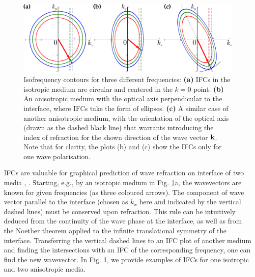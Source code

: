 \begin{figure}[ht] \caption{Isofrequency contours for three different frequencies: \textbf{(a)} IFCs in the isotropic medium are circular and centered in the $k=0$ point. \textbf{(b)} An anisotropic medium with the optical axis perpendicular to the interface, where IFCs take the form of ellipses. \textbf{(c)} A similar case of another anisotropic medium, with the orientation of the optical axis (drawn as the dashed black line) that warrants introducing the index of refraction for the shown direction of the wave vector ${\mathbf{k}}$. Note that for clarity, the plots (b) and (c) show the IFCs only for one wave polarisation. %
} \label{fg_ifc} \centering  %
	\includegraphics[width=.8\textwidth]{img/ifc_freqdispersion.pdf} 
\end{figure}
IFCs are valuable for graphical prediction of wave refraction on interface of two media \cite[p. 118]{shalaev2010book}, \cite{boardman2005negative}. Starting, e.g., by an isotropic medium in Fig. \ref{fg_ifc}a, the wavevectors are known for given frequencies (as three coloured arrows).
The component of wave vector parallel to the interface (chosen as $k_x$ here and indicated by the vertical dashed lines) must be conserved upon refraction. This rule can be intuitively deduced from the continuity of the wave phase at the interface, as well as from the Noether theorem applied to the infinite translational symmetry of the interface. Transferring the vertical dashed lines to an IFC plot of another medium and finding the intersections with an IFC of the corresponding frequency, one can find the new wavevector. 
In Fig. \ref{fg_ifc}, we provide examples of IFCs for one isotropic and two anisotropic media.

